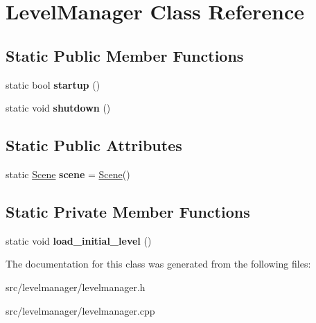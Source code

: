 \hypertarget{class_level_manager}{}\section{Level\+Manager Class Reference}
\label{class_level_manager}
\subsection*{Static Public Member Functions}
\begin{DoxyCompactItemize}
\item 
\hypertarget{class_level_manager_a6de44965b6cfa96ee32447c04ea4f658}{}static bool {\bfseries startup} ()\label{class_level_manager_a6de44965b6cfa96ee32447c04ea4f658}

\item 
\hypertarget{class_level_manager_aadc5e9780ea5d38bcc0a858b53ce3572}{}static void {\bfseries shutdown} ()\label{class_level_manager_aadc5e9780ea5d38bcc0a858b53ce3572}

\end{DoxyCompactItemize}
\subsection*{Static Public Attributes}
\begin{DoxyCompactItemize}
\item 
\hypertarget{class_level_manager_a4d11a24e404d8d36f638745f462b192b}{}static \hyperlink{class_scene}{Scene} {\bfseries scene} = \hyperlink{class_scene}{Scene}()\label{class_level_manager_a4d11a24e404d8d36f638745f462b192b}

\end{DoxyCompactItemize}
\subsection*{Static Private Member Functions}
\begin{DoxyCompactItemize}
\item 
\hypertarget{class_level_manager_aac5e0cec9b65d304b190c46bbcd2ae2b}{}static void {\bfseries load\+\_\+initial\+\_\+level} ()\label{class_level_manager_aac5e0cec9b65d304b190c46bbcd2ae2b}

\end{DoxyCompactItemize}


The documentation for this class was generated from the following files\+:\begin{DoxyCompactItemize}
\item 
src/levelmanager/levelmanager.\+h\item 
src/levelmanager/levelmanager.\+cpp\end{DoxyCompactItemize}
